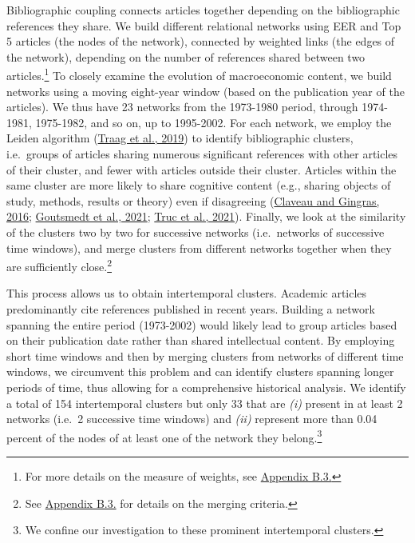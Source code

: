 \documentclass[
  12pt,
  onecolumn]{article}
\begin{document}
Bibliographic coupling connects articles together depending on the
bibliographic references they share. We build different relational
networks using EER and Top 5 articles (the nodes of the network),
connected by weighted links (the edges of the network), depending on the
number of references shared between two articles.\footnote{For more
  details on the measure of weights, see
  \protect\hyperlink{network}{Appendix B.3.}} To closely examine the
evolution of macroeconomic content, we build networks using a moving
eight-year window (based on the publication year of the articles). We
thus have 23 networks from the 1973-1980 period, through 1974-1981,
1975-1982, and so on, up to 1995-2002. For each network, we employ the
Leiden algorithm (\protect\hyperlink{ref-traag2019}{Traag et al., 2019})
to identify bibliographic clusters, i.e.~groups of articles sharing
numerous significant references with other articles of their cluster,
and fewer with articles outside their cluster. Articles within the same
cluster are more likely to share cognitive content (e.g., sharing
objects of study, methods, results or theory) even if disagreeing
(\protect\hyperlink{ref-claveau2016}{Claveau and Gingras, 2016};
\protect\hyperlink{ref-goutsmedt2021}{Goutsmedt et al., 2021};
\protect\hyperlink{ref-truc2021}{Truc et al., 2021}). Finally, we look
at the similarity of the clusters two by two for successive networks
(i.e.~networks of successive time windows), and merge clusters from
different networks together when they are sufficiently close.\footnote{See
  \protect\hyperlink{network}{Appendix B.3.} for details on the merging
  criteria.}

This process allows us to obtain intertemporal clusters. Academic
articles predominantly cite references published in recent years.
Building a network spanning the entire period (1973-2002) would likely
lead to group articles based on their publication date rather than
shared intellectual content. By employing short time windows and then by
merging clusters from networks of different time windows, we circumvent
this problem and can identify clusters spanning longer periods of time,
thus allowing for a comprehensive historical analysis. We identify a
total of 154 intertemporal clusters but only 33 that are \emph{(i)}
present in at least 2 networks (i.e.~2 successive time windows) and
\emph{(ii)} represent more than 0.04 percent of the nodes of at least
one of the network they belong.\footnote{We confine our investigation to
  these prominent intertemporal clusters.}
\end{document}
